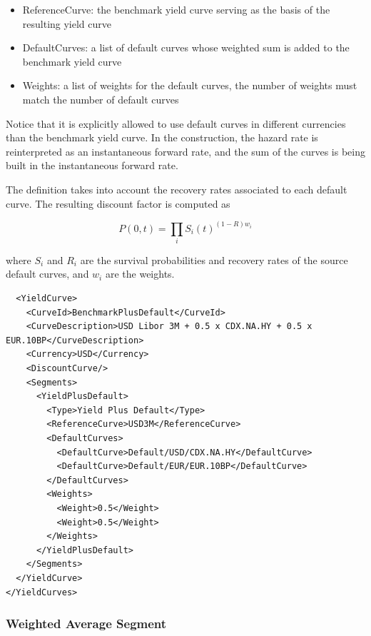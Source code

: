 \begin{itemize}
\item ReferenceCurve: the benchmark yield curve serving as the basis of the resulting yield curve
\item DefaultCurves: a list of default curves whose weighted sum is added to the benchmark yield curve
\item Weights: a list of weights for the default curves, the number of weights must match the number of default curves
\end{itemize}

Notice that it is explicitly allowed to use default curves in different currencies than the benchmark yield curve. In
the construction, the hazard rate is reinterpreted as an instantaneous forward rate, and the sum of the curves is being
built in the instantaneous forward rate.

The definition takes into account the recovery rates associated to each default curve. The resulting discount factor is
computed as

\begin{equation}
P(0,t) = \prod_i  S_i(t)^{(1-R)w_i}
\end{equation}

where $S_i$ and $R_i$ are the survival probabilities and recovery rates of the source default curves, and $w_i$ are the
weights.

\begin{listing}[H]
\begin{verbatim}
  <YieldCurve>
    <CurveId>BenchmarkPlusDefault</CurveId>
    <CurveDescription>USD Libor 3M + 0.5 x CDX.NA.HY + 0.5 x EUR.10BP</CurveDescription>
    <Currency>USD</Currency>
    <DiscountCurve/>
    <Segments>
      <YieldPlusDefault>
        <Type>Yield Plus Default</Type>
        <ReferenceCurve>USD3M</ReferenceCurve>
        <DefaultCurves>
          <DefaultCurve>Default/USD/CDX.NA.HY</DefaultCurve>
          <DefaultCurve>Default/EUR/EUR.10BP</DefaultCurve>
        </DefaultCurves>
        <Weights>
          <Weight>0.5</Weight>
          <Weight>0.5</Weight>
        </Weights>
      </YieldPlusDefault>
    </Segments>
  </YieldCurve>
</YieldCurves>
\end{verbatim}
\caption{Yield plus default curve segment}
\label{lst:yield_plus_default_segment}
\end{listing}

\subsubsection*{Weighted Average Segment}
\label{sec:weigthed_average}


